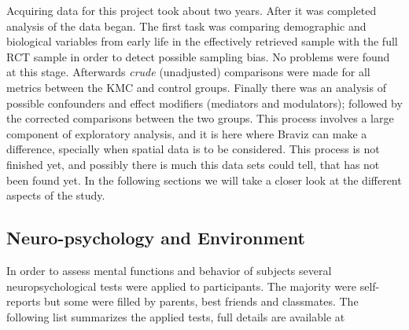 Acquiring data for this project took about two years. After it was completed analysis of the data began. The first task was comparing demographic and biological variables from early life in the effectively retrieved sample with the full RCT sample in order to detect possible sampling bias. No problems were found at this stage. Afterwards \emph{crude} (unadjusted) comparisons were made for all metrics between the KMC and control groups. Finally there was an analysis of possible confounders and effect modifiers (mediators and modulators); followed by the corrected comparisons between the two groups. This process involves a large component of exploratory analysis, and it is here where Braviz can make a difference, specially when spatial data is to be considered. This process is not finished yet, and possibly there is much this data sets could tell, that has not been found yet. In the following sections we will take a closer look at the different aspects of the study.

\subsection{Neuro-psychology and Environment}

In order to assess mental functions and behavior of subjects several neuropsychological tests were applied to participants. The majority were self-reports but some were filled by parents, best friends and classmates. The following list summarizes the applied tests, full details are available at \autocite{uriza_reporte_2015}

